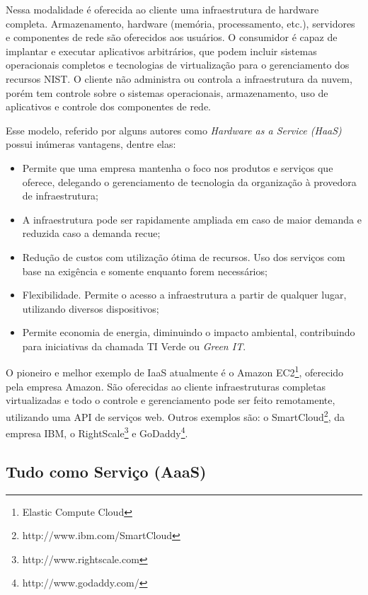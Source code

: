 Nessa modalidade é oferecida ao cliente uma infraestrutura de hardware completa.
Armazenamento, hardware (memória, processamento, etc.), servidores e componentes
de rede são oferecidos aos usuários. O consumidor é capaz de implantar e
executar aplicativos arbitrários, que podem incluir sistemas operacionais
completos e tecnologias de virtualização para o gerenciamento dos recursos
\textsf{NIST}. O cliente não administra ou controla a infraestrutura da
nuvem, porém tem controle sobre o sistemas operacionais, armazenamento, uso de
aplicativos e controle dos componentes de rede.

Esse modelo, referido por alguns autores como \textit{Hardware as a Service
(HaaS)} possui inúmeras vantagens, dentre elas:

\begin{itemize}
\setlength{\itemsep}{1pt}
\setlength{\parskip}{0pt}
\setlength{\parsep}{0pt}
\item Permite que uma empresa mantenha o foco nos produtos e
serviços que oferece, delegando o gerenciamento de tecnologia da organização à
provedora de infraestrutura;
\item A infraestrutura pode ser rapidamente ampliada em caso de
maior demanda e reduzida caso a demanda recue;
\item Redução de custos com utilização ótima de recursos. Uso dos
serviços com base na exigência e somente enquanto forem necessários;
\item Flexibilidade. Permite o acesso a infraestrutura a partir de
qualquer lugar, utilizando diversos dispositivos;
\item Permite economia de energia, diminuindo o impacto ambiental,
contribuindo para iniciativas da chamada TI Verde ou \textit{Green IT}.
\end{itemize}

O pioneiro e melhor exemplo de IaaS atualmente é o Amazon EC2\footnote{Elastic
Compute Cloud}, oferecido pela empresa Amazon. São oferecidas ao cliente
infraestruturas completas virtualizadas e todo o controle e gerenciamento pode
ser feito remotamente, utilizando uma API de serviços web. Outros exemplos são:
o SmartCloud\footnote{http://www.ibm.com/SmartCloud}, da empresa IBM, o
RightScale\footnote{http://www.rightscale.com} e
GoDaddy\footnote{http://www.godaddy.com/}.

\subsection{Tudo como Serviço (AaaS)} 
\label{computacaoemnuvem:classificacoes:servicos:XaaS}

